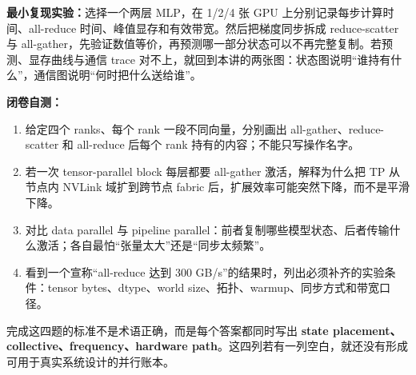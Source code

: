 \textbf{最小复现实验：}选择一个两层 MLP，在 1/2/4 张 GPU 上分别记录每步计算时间、all-reduce 时间、峰值显存和有效带宽。然后把梯度同步拆成 reduce-scatter 与 all-gather，先验证数值等价，再预测哪一部分状态可以不再完整复制。若预测、显存曲线与通信 trace 对不上，就回到本讲的两张图：状态图说明“谁持有什么”，通信图说明“何时把什么送给谁”。

\textbf{闭卷自测：}
\begin{enumerate}
    \item 给定四个 ranks、每个 rank 一段不同向量，分别画出 all-gather、reduce-scatter 和 all-reduce 后每个 rank 持有的内容；不能只写操作名字。
    \item 若一次 tensor-parallel block 每层都要 all-gather 激活，解释为什么把 TP 从节点内 NVLink 域扩到跨节点 fabric 后，扩展效率可能突然下降，而不是平滑下降。
    \item 对比 data parallel 与 pipeline parallel：前者复制哪些模型状态、后者传输什么激活；各自最怕“张量太大”还是“同步太频繁”。
    \item 看到一个宣称“all-reduce 达到 300 GB/s”的结果时，列出必须补齐的实验条件：tensor bytes、dtype、world size、拓扑、warmup、同步方式和带宽口径。
\end{enumerate}

完成这四题的标准不是术语正确，而是每个答案都同时写出 \textbf{state placement、collective、frequency、hardware path}。这四列若有一列空白，就还没有形成可用于真实系统设计的并行账本。


